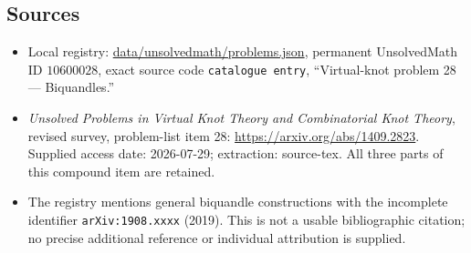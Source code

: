\documentclass[11pt]{article}
\begin{document}
\subsection{Sources}
\begin{itemize}
\item Local registry: \url{data/unsolvedmath/problems.json}, permanent UnsolvedMath ID $10600028$, exact source code \texttt{catalogue entry}, ``Virtual-knot problem 28 --- Biquandles.''
\item \emph{Unsolved Problems in Virtual Knot Theory and Combinatorial Knot Theory}, revised survey, problem-list item 28: \url{https://arxiv.org/abs/1409.2823}. Supplied access date: 2026-07-29; extraction: source-tex. All three parts of this compound item are retained.
\item The registry mentions general biquandle constructions with the incomplete identifier \texttt{arXiv:1908.xxxx} (2019). This is not a usable bibliographic citation; no precise additional reference or individual attribution is supplied.
\end{itemize}
\end{document}
